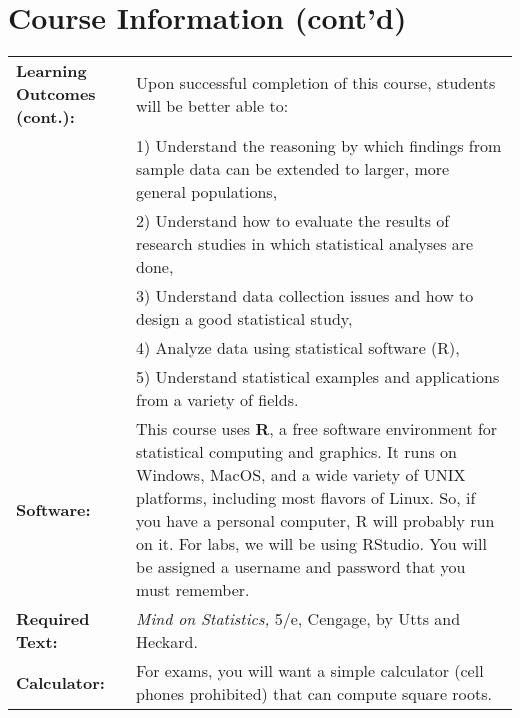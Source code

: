 \documentclass[10pt]{amsart}
\begin{document}
\section*{Course Information (cont'd)}
\noindent
\begin{tabular}{p{1.4in}p{5in}}
 
  {\bf Learning Outcomes (cont.):} & Upon successful completion of this course, students will be better able to:\\
  & 1) Understand the reasoning by which findings from sample data can be extended to larger, more general populations,\\
  & 2) Understand how to evaluate the results of research studies in which statistical analyses are done,\\
  & 3) Understand data collection issues and how to design a good statistical study,\\
  & 4) Analyze data using statistical software (R),\\
  & 5) Understand statistical examples and applications from a variety of fields.\\
  
  {\bf Software:} & This course uses {\bf R}, a free software environment for statistical computing and graphics.  It runs on Windows, MacOS, and a wide variety of UNIX platforms, including most flavors of Linux.  So, if you have a personal computer, R will probably run on it.  For labs, we will be using RStudio. You will be assigned a username and password that you must remember.\\
  {\bf Required Text:} & {\it Mind on Statistics,} 5/e, Cengage, by Utts and Heckard.\\
  {\bf Calculator:} & For exams, you will want a simple calculator (cell phones prohibited) that can compute square roots.
  \end{tabular}
  
\end{document}
